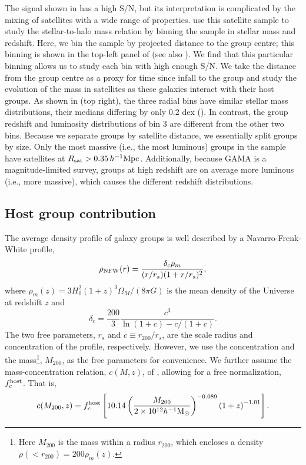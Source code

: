 The signal shown in  has a high S/N, but its interpretation is complicated by the 
mixing of satellites with a wide range of properties. \cite{vanuitert16} use this satellite sample 
to study the stellar-to-halo mass relation by binning the sample in stellar mass and redshift. 
Here, we bin the sample by projected distance to the group centre; this binning is shown in the 
top-left panel of  (see also ). We find that this particular 
binning allows us to study each bin with high enough S/N. We take the distance from the group 
centre as a proxy for time since infall to the group \citep[e.g.,][]{gao04,chang13_stripping} and study the 
evolution of the mass in satellites as these galaxies interact with their host groups. As shown in 
 (top right), the three radial bins have similar stellar mass distributions, 
their medians differing by only 0.2 dex (). In contrast, the group redshift and 
luminosity distributions of bin 3 are different from the other two bins. Because we separate groups 
by satellite distance, we essentially split groups by size. Only the most massive (i.e., the most 
luminous) groups in the sample have satellites at $R_{\rm sat}>0.35\,h^{-1}{\rm Mpc}$. Additionally, 
because GAMA is a magnitude-limited survey, groups at high redshift are on average more luminous 
(i.e., more massive), which causes the different redshift distributions.


\subsection{Host group contribution}\label{s:sigma_host}

The average density profile of galaxy groups is well described by a Navarro-Frenk-White 
\citep[NFW,][]{nfw95} profile,
\begin{equation}\label{eq:NFW}
 \rho_{\rm NFW}(r) = \frac{\delta_c \rho_m}{(r/r_s)(1+r/r_s)^2},
\end{equation}
where $\rho_m(z)=3H_0^2(1+z)^3\Omega_M/(8\pi G)$ is the mean density of the Universe at redshift 
$z$ and
\begin{equation}\label{eq:delta_c}
 \delta_c = \frac{200}{3}\frac{c^3}{\ln(1+c) - c/(1+c)}.
\end{equation}
The two free parameters, $r_s$ and $c \equiv r_{200}/r_s$, are the scale radius and concentration 
of the profile, respectively. However, we use the concentration and the mass\footnote{Here 
$M_{200}$ is the mass within a radius $r_{200}$, which encloses a density 
$\rho(<r_{200})=200\rho_m(z)$.}, $M_{200}$, as the free parameters for convenience. We further 
assume the mass-concentration relation, $c(M,z)$, of \cite{duffy08}, allowing for a free 
normalization, $f_c^{\rm host}$. That is,
\begin{equation}\label{eq:cM}
 c(M_{200},z) = f_c^{\rm host}\left[10.14\left(\frac{M_{200}}{2\times10^{12}h^{-1}{\rm 
M}_\odot}\right)^{-0.089}\left(1+z\right)^{-1.01}\right].
\end{equation}


